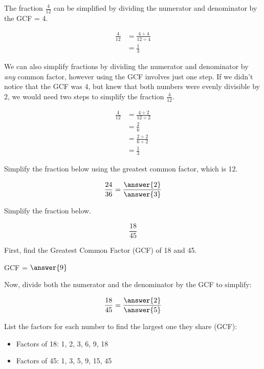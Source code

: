 \documentclass{ximera}[font=12pt]  %
\begin{document}
\begin{example}

The fraction $\textstyle \frac{4}{12}$ can be simplified by dividing the numerator and denominator by the GCF = 4.

\begin{align*}
\frac{4}{12} &= \frac{4 \div 4}{12 \div 4} \\[1em]
             &= \frac{1}{3}
\end{align*}


We can also simplify fractions by dividing the numerator and denominator by \emph{any} common factor, however using the GCF involves just one step.
If we didn't notice that the GCF was 4, but knew that both numbers were evenly divisible by 2, we would need two steps to simplify 
the fraction $\textstyle \frac{4}{12}.$

\begin{align*}
\frac{4}{12} &= \frac{4 \div 2}{12 \div 2} \\[1em]
             &= \frac{2}{6}             \\[1em]
             &= \frac{2 \div 2}{6 \div 2} \\[1em]
             &= \frac{1}{3}
\end{align*}

\end{example}


\begin{problem}
  Simplify the fraction below using the greatest common factor, which is 12.

  \[
  \frac{24}{36} = \frac{\answer{2}}{\answer{3}}
  \]

\end{problem}



\begin{problem}
  Simplify the fraction below.

  \[ \frac{18}{45} \]

  First, find the Greatest Common Factor (GCF) of 18 and 45.

  GCF = $\answer{9}$

  Now, divide both the numerator and the denominator by the GCF to simplify:

  \[ \frac{18}{45} = \frac{\answer{2}}{\answer{5}} \]

  \begin{hint}
    List the factors for each number to find the largest one they share (GCF):
    \begin{itemize}
        \item Factors of 18: 1, 2, 3, 6, 9, 18
        \item Factors of 45: 1, 3, 5, 9, 15, 45
    \end{itemize}
  \end{hint}
\end{problem}
\end{document}
